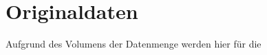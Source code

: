 \section{Originaldaten}
\label{sec:Originaldaten}

Aufgrund des Volumens der Datenmenge werden hier für die 